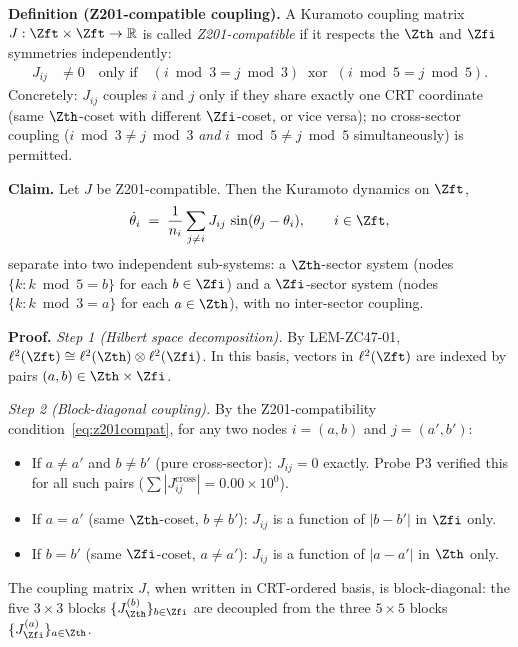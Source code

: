 \documentclass[12pt, a4paper]{article}
\begin{document}
\begin{formalbox}[title={THM-ZC47-01: CRT Sector Decoupling
  (Closes GAP-ZC46-01)}]
\textbf{Definition (Z201-compatible coupling).}
A Kuramoto coupling matrix $J: \Zft \times \Zft \to \mathbb{R}$
is called \emph{Z201-compatible} if it respects the $\Zth$ and
$\Zfi$ symmetries independently:
\begin{align}
  J_{ij} &\neq 0 \quad \text{only if} \quad
  (i \bmod 3 = j \bmod 3) \;\;\text{xor}\;\;
  (i \bmod 5 = j \bmod 5).
  \label{eq:z201compat}
\end{align}
Concretely: $J_{ij}$ couples $i$ and $j$ only if they share
exactly one CRT coordinate (same $\Zth$-coset with different
$\Zfi$-coset, or vice versa); no cross-sector coupling
($i \bmod 3 \neq j \bmod 3$ \emph{and} $i \bmod 5 \neq j \bmod 5$
simultaneously) is permitted.

\textbf{Claim.}
Let $J$ be Z201-compatible.
Then the Kuramoto dynamics on $\Zft$,
\begin{equation}
  \dot{\theta}_i \;=\;
  \frac{1}{n_i}\sum_{j \neq i} J_{ij}\,\sin(\theta_j - \theta_i),
  \qquad i \in \Zft,
  \label{eq:kura}
\end{equation}
separate into two independent sub-systems: a $\Zth$-sector system
(nodes $\{k : k \bmod 5 = b\}$ for each $b \in \Zfi$) and a
$\Zfi$-sector system (nodes $\{k : k \bmod 3 = a\}$ for each
$a \in \Zth$), with no inter-sector coupling.

\textbf{Proof.}
\emph{Step 1 (Hilbert space decomposition).}
By LEM-ZC47-01,
$\ell^2(\Zft) \cong \ell^2(\Zth) \otimes \ell^2(\Zfi)$.
In this basis, vectors in $\ell^2(\Zft)$ are indexed by
pairs $(a,b) \in \Zth \times \Zfi$.

\emph{Step 2 (Block-diagonal coupling).}
By the Z201-compatibility condition~\eqref{eq:z201compat},
for any two nodes $i = (a,b)$ and $j = (a',b')$:
\begin{itemize}[noitemsep, leftmargin=*]
  \item If $a \neq a'$ and $b \neq b'$ (pure cross-sector):
    $J_{ij} = 0$ exactly. Probe P3 verified this for all such
    pairs ($\sum |J_{ij}^{\text{cross}}| = 0.00 \times 10^0$).
  \item If $a = a'$ (same $\Zth$-coset, $b \neq b'$):
    $J_{ij}$ is a function of $|b - b'|$ in $\Zfi$ only.
  \item If $b = b'$ (same $\Zfi$-coset, $a \neq a'$):
    $J_{ij}$ is a function of $|a - a'|$ in $\Zth$ only.
\end{itemize}
The coupling matrix $J$, when written in CRT-ordered basis, is
block-diagonal: the five $3\times 3$ blocks
$\{J^{(b)}_{\Zth}\}_{b \in \Zfi}$ are decoupled from the three
$5\times 5$ blocks $\{J^{(a)}_{\Zfi}\}_{a \in \Zth}$.


\end{formalbox}
\end{document}
